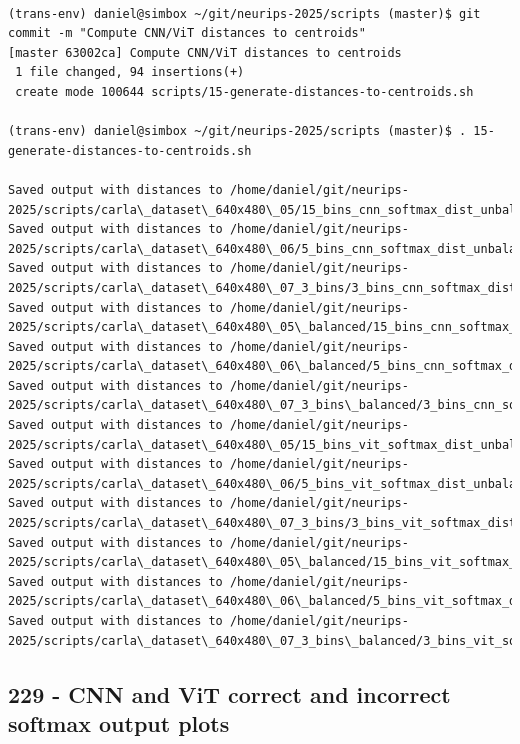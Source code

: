 \begin{verbatim}

(trans-env) daniel@simbox ~/git/neurips-2025/scripts (master)$ git commit -m "Compute CNN/ViT distances to centroids"
[master 63002ca] Compute CNN/ViT distances to centroids
 1 file changed, 94 insertions(+)
 create mode 100644 scripts/15-generate-distances-to-centroids.sh

(trans-env) daniel@simbox ~/git/neurips-2025/scripts (master)$ . 15-generate-distances-to-centroids.sh 

Saved output with distances to /home/daniel/git/neurips-2025/scripts/carla\_dataset\_640x480\_05/15_bins_cnn_softmax_dist_unbalanced.npy
Saved output with distances to /home/daniel/git/neurips-2025/scripts/carla\_dataset\_640x480\_06/5_bins_cnn_softmax_dist_unbalanced.npy
Saved output with distances to /home/daniel/git/neurips-2025/scripts/carla\_dataset\_640x480\_07_3_bins/3_bins_cnn_softmax_dist_unbalanced.npy
Saved output with distances to /home/daniel/git/neurips-2025/scripts/carla\_dataset\_640x480\_05\_balanced/15_bins_cnn_softmax_dist\_balanced.npy
Saved output with distances to /home/daniel/git/neurips-2025/scripts/carla\_dataset\_640x480\_06\_balanced/5_bins_cnn_softmax_dist\_balanced.npy
Saved output with distances to /home/daniel/git/neurips-2025/scripts/carla\_dataset\_640x480\_07_3_bins\_balanced/3_bins_cnn_softmax_dist\_balanced.npy
Saved output with distances to /home/daniel/git/neurips-2025/scripts/carla\_dataset\_640x480\_05/15_bins_vit_softmax_dist_unbalanced.npy
Saved output with distances to /home/daniel/git/neurips-2025/scripts/carla\_dataset\_640x480\_06/5_bins_vit_softmax_dist_unbalanced.npy
Saved output with distances to /home/daniel/git/neurips-2025/scripts/carla\_dataset\_640x480\_07_3_bins/3_bins_vit_softmax_dist_unbalanced.npy
Saved output with distances to /home/daniel/git/neurips-2025/scripts/carla\_dataset\_640x480\_05\_balanced/15_bins_vit_softmax_dist\_balanced.npy
Saved output with distances to /home/daniel/git/neurips-2025/scripts/carla\_dataset\_640x480\_06\_balanced/5_bins_vit_softmax_dist\_balanced.npy
Saved output with distances to /home/daniel/git/neurips-2025/scripts/carla\_dataset\_640x480\_07_3_bins\_balanced/3_bins_vit_softmax_dist\_balanced.npy

\end{verbatim}

\subsection{229 - CNN and ViT correct and incorrect softmax output plots}
\label{app_res:229}

